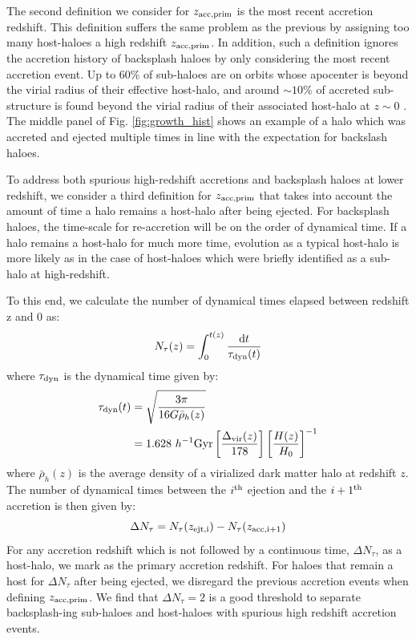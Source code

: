 \documentclass[useAMS,fleqn,usenatbib]{mnras}
\begin{document}
The second definition we consider for $z_{\rm acc, prim}$ is the most recent accretion redshift.  This definition suffers the same problem as the previous by assigning too many host-haloes a high redshift $z_{\rm acc, prim}$.  In addition, such a definition ignores the accretion history of backsplash haloes by only considering the most recent accretion event.  Up to 60\% of sub-haloes are on orbits whose apocenter is beyond the virial radius of their effective host-halo, and around $\sim 10\%$ of accreted sub-structure is found beyond the virial radius of their associated host-halo at $z\sim 0$ \citep{Lin:2003bi, Gill:2005ge, Sales:2007kq, Ludlow:2009ix,  Wetzel:2014up, vandenBosch:2017fj}.  The middle panel of Fig. \ref{fig:growth_hist} shows an example of a halo which was accreted and ejected multiple times in line with the expectation for backslash haloes.  

To address both spurious high-redshift accretions and backsplash haloes at lower redshift, we consider a third definition for $z_{\rm acc, prim}$ that takes into account the amount of time a halo remains a host-halo after being ejected.  For backsplash haloes, the time-scale for re-accretion will be on the order of dynamical time.  If a halo remains a host-halo for much more time, evolution as a typical host-halo is more likely as in the case of host-haloes which were briefly identified as a sub-halo at high-redshift.

To this end, we calculate the number of dynamical times elapsed between redshift z and 0 as:
%
\begin{equation}
N_{\tau}(z) = \int_0^{t(z)} \frac{\mathrm{d}t}{\tau_{\rm dyn}(t)}
\label{eq:t_dyn}
\end{equation}
%
where $\tau_{\rm dyn}$ is the dynamical time given by:
%
\begin{align}
\tau_{\rm dyn}(t) &= \sqrt{\frac{3\pi}{16G\bar{\rho}_h(z)}} \\ \nonumber
                           &=1.628 ~h^{-1}{\rm Gyr}\left[ \frac{\Delta_{\rm vir}(z)}{178} \right] \left[ \frac{H(z)}{H_0}\right]^{-1}
\end{align}
%
where $\bar{\rho}_h(z)$ is the average density of a virialized dark matter halo at redshift $z$.  The number of dynamical times between the $i^{\rm th}$ ejection and the $i+1^{\rm th}$ accretion is then given by:
%
\begin{equation}
 \Delta N_{\tau} = N_{\tau}(z_{\rm ejt, i}) - N_{\tau}(z_{\rm acc, i+1})
\end{equation}
%
For any accretion redshift which is not followed by a continuous time, $\Delta N_{\tau}$, as a host-halo, we mark as the primary accretion redshift.  For haloes that remain a host for $\Delta N_{\tau}$ after being ejected, we disregard the previous accretion events when defining $z_{\rm acc, prim}$.  We find that $\Delta N_{\tau} = 2$ is a good threshold to separate backsplash-ing sub-haloes and host-haloes with spurious high redshift accretion events.  
\end{document}
